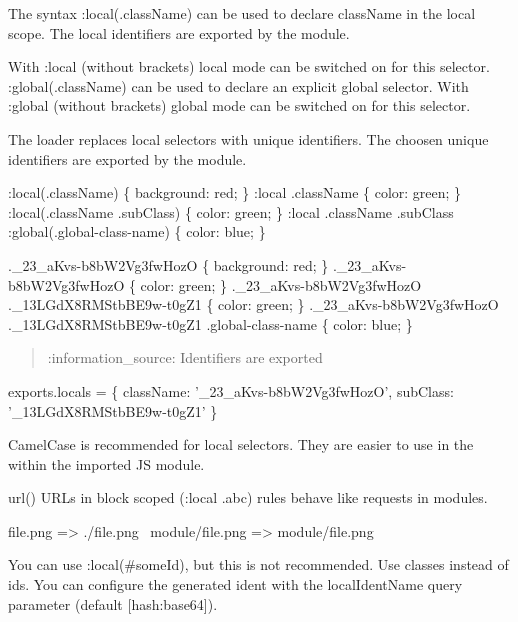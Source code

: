 The syntax {\ttfamily \+:local(.class\+Name)} can be used to declare {\ttfamily class\+Name} in the local scope. The local identifiers are exported by the module.

With {\ttfamily \+:local} (without brackets) local mode can be switched on for this selector. {\ttfamily \+:global(.class\+Name)} can be used to declare an explicit global selector. With {\ttfamily \+:global} (without brackets) global mode can be switched on for this selector.

The loader replaces local selectors with unique identifiers. The choosen unique identifiers are exported by the module.


\begin{DoxyCode}
:local(.className) \{ background: red; \}
:local .className \{ color: green; \}
:local(.className .subClass) \{ color: green; \}
:local .className .subClass :global(.global-class-name) \{ color: blue; \}
\end{DoxyCode}



\begin{DoxyCode}
.\_23\_aKvs-b8bW2Vg3fwHozO \{ background: red; \}
.\_23\_aKvs-b8bW2Vg3fwHozO \{ color: green; \}
.\_23\_aKvs-b8bW2Vg3fwHozO .\_13LGdX8RMStbBE9w-t0gZ1 \{ color: green; \}
.\_23\_aKvs-b8bW2Vg3fwHozO .\_13LGdX8RMStbBE9w-t0gZ1 .global-class-name \{ color: blue; \}
\end{DoxyCode}


\begin{quote}
\+:information\+\_\+source\+: Identifiers are exported \end{quote}



\begin{DoxyCode}
exports.locals = \{
  className: '\_23\_aKvs-b8bW2Vg3fwHozO',
  subClass: '\_13LGdX8RMStbBE9w-t0gZ1'
\}
\end{DoxyCode}


Camel\+Case is recommended for local selectors. They are easier to use in the within the imported JS module.

{\ttfamily url()} U\+R\+Ls in block scoped ({\ttfamily \+:local .abc}) rules behave like requests in modules.


\begin{DoxyCode}
file.png => ./file.png
~module/file.png => module/file.png
\end{DoxyCode}


You can use {\ttfamily \+:local(\#some\+Id)}, but this is not recommended. Use classes instead of ids. You can configure the generated ident with the {\ttfamily local\+Ident\+Name} query parameter (default {\ttfamily \mbox{[}hash\+:base64\mbox{]}}).

